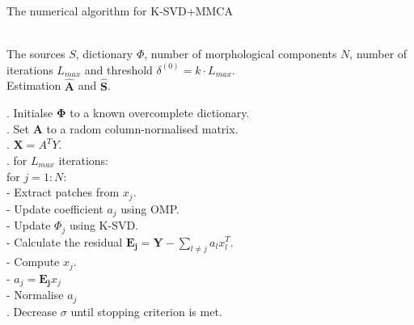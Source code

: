 \begin{algorithm}[!htbp] 
\caption{The numerical algorithm for K-SVD+MMCA} 
\label{alg:Framwork} 
\begin{algorithmic}
\REQUIRE ~~\\%
The sources $S$, dictionary $\Phi$, number of morphological components $N$, number of iterations $L_{max}$ and threshold $\delta^{(0)} = k \cdot L_{max}$.
\ENSURE ~~\\ %
Estimation $\hat{\mathbf{A}}$ and $\hat{\mathbf{S}}$.

. Initialse $\mathbf{\Phi}$ to a known overcomplete dictionary.\\
. Set $\mathbf{A}$ to a radom column-normalised matrix.\\
. $\mathbf{X} = A^T Y$.\\

. for $L_{max}$ iterations:\\
\quad \quad for $j = 1:N$:\\
\quad \quad \quad - Extract patches from $x_j$.\\
\quad \quad \quad - Update coefficient $a_j$ using OMP.\\
\quad \quad \quad - Update $\Phi_j$ using K-SVD.\\
\quad \quad \quad - Calculate the residual $\mathbf{E_j} = \mathbf{Y} - \sum_{l\neq j}a_lx_l^T$. \\
\quad \quad \quad - Compute $x_j$. \\
\quad \quad \quad - $a_j = \mathbf{E_j}x_j$ \\
\quad \quad \quad - Normalise $a_j$  \\
. Decrease $\sigma$ until stopping criterion is met. \\
\end{algorithmic}
\end{algorithm}

